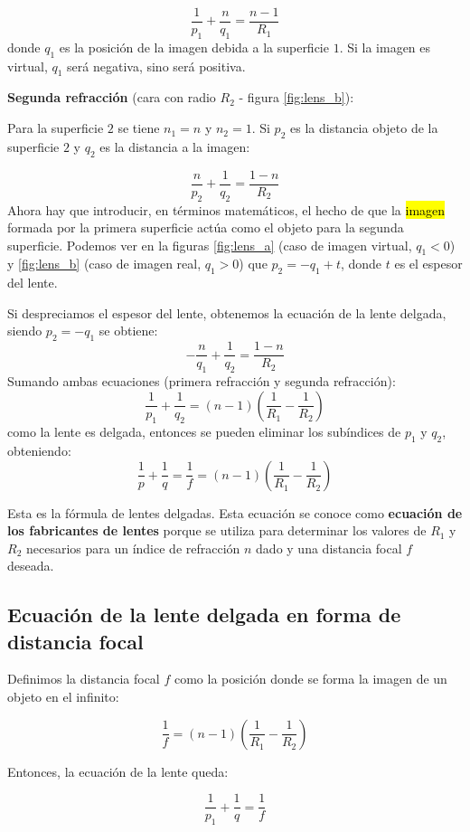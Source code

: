 \[
\frac{1}{p_1} + \frac{n}{q_1} = \frac{n - 1}{R_1}
\]
donde \(q_1\) es la posición de la imagen debida a la superficie \(1\). Si la imagen es virtual, \(q_1\) será negativa, sino será positiva.

\textbf{Segunda refracción} (cara con radio \(R_2\) - figura \ref{fig:lens_b}):

\noindent Para la superficie \(2\) se tiene \(n_1 = n\) y \(n_2 = 1\). Si \(p_2\) es la distancia objeto de la superficie \(2\) y \(q_2\) es la distancia a la imagen:

\[
\frac{n}{p_2} + \frac{1}{q_2} = \frac{1 - n}{R_2}
\]
Ahora hay que introducir, en términos matemáticos, el hecho de que la \hl{imagen} formada por la primera superficie actúa como el objeto para la segunda superficie. Podemos ver en la figuras \ref{fig:lens_a} (caso de imagen virtual, \(q_1 < 0\)) y \ref{fig:lens_b} (caso de imagen real, \(q_1 > 0\)) que \(p_2 = -q_1 + t\), donde \(t\) es el espesor del lente.

Si despreciamos el espesor del lente, obtenemos la ecuación de la lente delgada, siendo \(p_2 = -q_1\) se obtiene:
\[
  -\frac{n}{q_1} + \frac{1}{q_2} = \frac{1 - n}{R_2}
\]
Sumando ambas ecuaciones (primera refracción y segunda refracción):
\[
\frac{1}{p_1} + \frac{1}{q_2} = (n - 1)\left( \frac{1}{R_1} - \frac{1}{R_2} \right)
\]
como la lente es delgada, entonces se pueden eliminar los subíndices de \(p_1\) y \(q_2\), obteniendo:
\[
\frac{1}{p} + \frac{1}{q} = \frac{1}{f} = (n - 1)\left( \frac{1}{R_1} - \frac{1}{R_2} \right)
\]

Esta es la fórmula de lentes delgadas. Esta ecuación se conoce como \textbf{ecuación de los fabricantes de lentes} porque se utiliza para determinar los valores de \(R_1\) y \(R_2\) necesarios para un índice de refracción \(n\) dado y una distancia focal \(f\) deseada.

\subsection{Ecuación de la lente delgada en forma de distancia focal}

Definimos la distancia focal \(f\) como la posición donde se forma la imagen de un objeto en el infinito:

\[
\frac{1}{f} = (n - 1)\left( \frac{1}{R_1} - \frac{1}{R_2} \right)
\]

Entonces, la ecuación de la lente queda:

\[
\frac{1}{p_1} + \frac{1}{q} = \frac{1}{f}
\]
